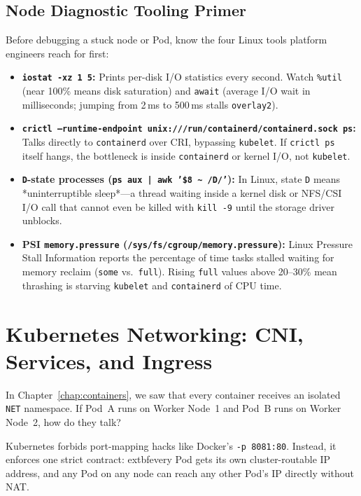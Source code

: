 \subsection{Node Diagnostic Tooling Primer}
Before debugging a stuck node or Pod, know the four Linux tools platform engineers reach for first:
\begin{itemize}[leftmargin=12pt]
  \item \textbf{\texttt{iostat -xz 1 5}:} Prints per-disk I/O statistics every second. Watch \texttt{\%util} (near 100\% means disk saturation) and \texttt{await} (average I/O wait in milliseconds; jumping from 2\,ms to 500\,ms stalls \texttt{overlay2}).
  \item \textbf{\texttt{crictl --runtime-endpoint unix:///run/containerd/containerd.sock ps}:} Talks directly to \texttt{containerd} over CRI, bypassing \texttt{kubelet}. If \texttt{crictl ps} itself hangs, the bottleneck is inside \texttt{containerd} or kernel I/O, not \texttt{kubelet}.
  \item \textbf{\texttt{D}-state processes (\texttt{ps aux | awk '\$8 \textasciitilde{} /D/'}):} In Linux, state \texttt{D} means *uninterruptible sleep*---a thread waiting inside a kernel disk or NFS/CSI I/O call that cannot even be killed with \texttt{kill -9} until the storage driver unblocks.
  \item \textbf{PSI \texttt{memory.pressure} (\texttt{/sys/fs/cgroup/memory.pressure}):} Linux Pressure Stall Information reports the percentage of time tasks stalled waiting for memory reclaim (\texttt{some} vs.\ \texttt{full}). Rising \texttt{full} values above 20--30\% mean thrashing is starving \texttt{kubelet} and \texttt{containerd} of CPU time.
\end{itemize}

\section{Kubernetes Networking: CNI, Services, and Ingress}

In Chapter~\ref{chap:containers}, we saw that every container receives an isolated \texttt{NET} namespace. If Pod~A runs on Worker Node~1 and Pod~B runs on Worker Node~2, how do they talk?

\begin{intuitionbox}
Kubernetes forbids port-mapping hacks like Docker's \texttt{-p 8081:80}. Instead, it enforces one strict contract: 	extbf{every Pod gets its own cluster-routable IP address, and any Pod on any node can reach any other Pod's IP directly without NAT.}
\end{intuitionbox}

